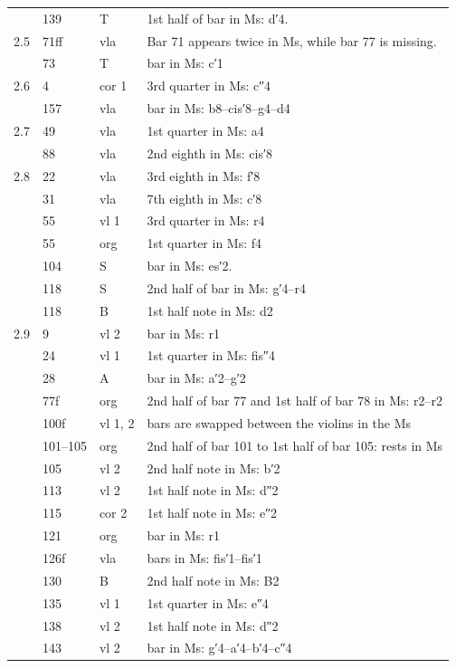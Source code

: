\documentclass[parskip=full]{scrreprt}
\begin{document}
\begin{longtable}{lll L{10cm}}
	    & 139 & T     & 1st half of bar in Ms: d′4. \\
	2.5 & 71ff & vla  & Bar 71 appears twice in Ms, while bar 77 is missing. \\
	    & 73  & T     & bar in Ms: c′1 \\
	2.6 & 4   & cor 1 & 3rd quarter in Ms: c″4 \\
	    & 157 & vla   & bar in Ms: b8–cis′8–g4–d4 \\
	2.7 & 49  & vla   & 1st quarter in Ms: a4 \\
	    & 88  & vla   & 2nd eighth in Ms: cis′8 \\
	2.8 & 22  & vla   & 3rd eighth in Ms: f′8 \\
	    & 31  & vla   & 7th eighth in Ms: c′8 \\
	    & 55  & vl 1  & 3rd quarter in Ms: r4 \\
	    & 55  & org   & 1st quarter in Ms: f4 \\
	    & 104 & S     & bar in Ms: es′2. \\
	    & 118 & S     & 2nd half of bar in Ms: g′4–r4 \\
	    & 118 & B     & 1st half note in Ms: d2 \\
	2.9 & 9   & vl 2  & bar in Ms: r1 \\
	    & 24  & vl 1  & 1st quarter in Ms: fis″4 \\
	    & 28  & A     & bar in Ms: a′2–g′2 \\
	    & 77f & org   & 2nd half of bar 77 and 1st half of bar 78 in Ms: r2–r2 \\
	    & 100f & vl 1, 2 & bars are swapped between the violins in the Ms \\
	    & 101–105 & org & 2nd half of bar 101 to 1st half of bar 105: rests in Ms \\
	    & 105 & vl 2  & 2nd half note in Ms: b′2\\
	    & 113 & vl 2  & 1st half note in Ms: d″2 \\
	    & 115 & cor 2 & 1st half note in Ms: e″2 \\
	    & 121 & org   & bar in Ms: r1 \\
	    & 126f & vla  & bars in Ms: fis′1–fis′1 \\
	    & 130 & B     & 2nd half note in Ms: B2 \\
	    & 135 & vl 1  & 1st quarter in Ms: e″4 \\
	    & 138 & vl 2  & 1st half note in Ms: d″2 \\
	    & 143 & vl 2  & bar in Ms: g′4–a′4–b′4–c″4 \\

\end{longtable}
\end{document}
